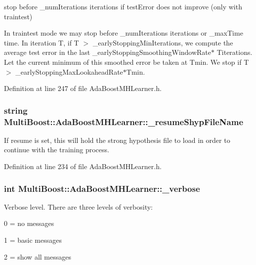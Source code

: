 stop before \-\_\-num\-Iterations iterations if test\-Error does not improve (only with traintest) 

In traintest mode we may stop before \-\_\-num\-Iterations iterations or \-\_\-max\-Time time. In iteration T, if T $>$ \-\_\-early\-Stopping\-Min\-Iterations, we compute the average test error in the last \-\_\-early\-Stopping\-Smoothing\-Window\-Rate$\ast$ Titerations. Let the current minimum of this smoothed error be taken at Tmin. We stop if T $>$ \-\_\-early\-Stopping\-Max\-Lookahead\-Rate$\ast$\-Tmin. 

Definition at line 247 of file Ada\-Boost\-M\-H\-Learner.\-h.

\hypertarget{classMultiBoost_1_1AdaBoostMHLearner_a2e6988a496276d32439f95970144c95c}{
\subsubsection[{\-\_\-resume\-Shyp\-File\-Name}]{\setlength{\rightskip}{0pt plus 5cm}string Multi\-Boost\-::\-Ada\-Boost\-M\-H\-Learner\-::\-\_\-resume\-Shyp\-File\-Name\hspace{0.3cm}{\ttfamily [protected]}}}\label{classMultiBoost_1_1AdaBoostMHLearner_a2e6988a496276d32439f95970144c95c}
If resume is set, this will hold the strong hypothesis file to load in order to continue with the training process. 

Definition at line 234 of file Ada\-Boost\-M\-H\-Learner.\-h.

\hypertarget{classMultiBoost_1_1AdaBoostMHLearner_a03f43502f6ffe9873dc383cc75cfa13d}{
\subsubsection[{\-\_\-verbose}]{\setlength{\rightskip}{0pt plus 5cm}int Multi\-Boost\-::\-Ada\-Boost\-M\-H\-Learner\-::\-\_\-verbose\hspace{0.3cm}{\ttfamily [protected]}}}\label{classMultiBoost_1_1AdaBoostMHLearner_a03f43502f6ffe9873dc383cc75cfa13d}
Verbose level. There are three levels of verbosity\-:
\begin{DoxyItemize}
\item 0 = no messages
\item 1 = basic messages
\item 2 = show all messages 
\end{DoxyItemize}

